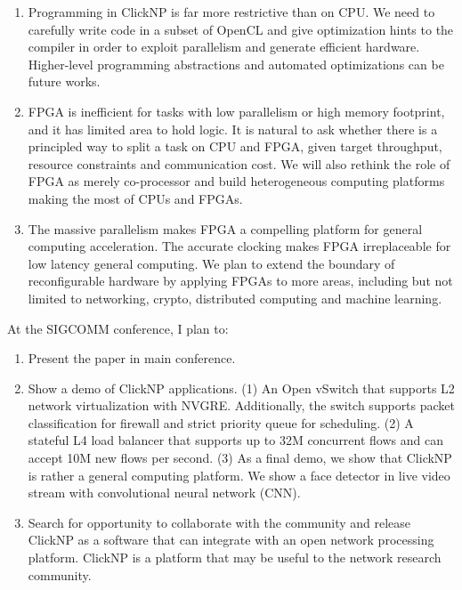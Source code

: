 \documentclass[10pt,a4paper]{article}
\begin{document}
\begin{enumerate}
	\item Programming in ClickNP is far more restrictive than on CPU.
	We need to carefully write code in a subset of OpenCL and give optimization hints to the compiler in order to exploit parallelism and generate efficient hardware.
	Higher-level programming abstractions and automated optimizations can be future works.
	\item FPGA is inefficient for tasks with low parallelism or high memory footprint, and it has limited area to hold logic.
	It is natural to ask whether there is a principled way to split a task on CPU and FPGA, given target throughput, resource constraints and communication cost.
	We will also rethink the role of FPGA as merely co-processor and build heterogeneous computing platforms making the most of CPUs and FPGAs.
	\item The massive parallelism makes FPGA a compelling platform for general computing acceleration.
	The accurate clocking makes FPGA irreplaceable for low latency general computing.
	We plan to extend the boundary of reconfigurable hardware by applying FPGAs to more areas, including but not limited to networking, crypto, distributed computing and machine learning.
\end{enumerate}


\spacedhrule{0.5em}{-0.8em}  %


At the SIGCOMM conference, I plan to:
\begin{enumerate}
	\item Present the paper in main conference.
	\item Show a demo of ClickNP applications. (1) An Open vSwitch that supports L2 network virtualization with NVGRE. Additionally, the switch supports packet classification for firewall and strict priority queue for scheduling.
	(2) A stateful L4 load balancer that supports up to 32M concurrent flows and can accept 10M new flows per second.
	(3) As a final demo, we show that ClickNP is rather a general computing platform. We show a face detector in live video stream with convolutional neural network (CNN).
	\item Search for opportunity to collaborate with the community and release ClickNP as a software that can integrate with an open network processing platform. ClickNP is a platform that may be useful to the network research community. 
\end{enumerate}
\end{document}
